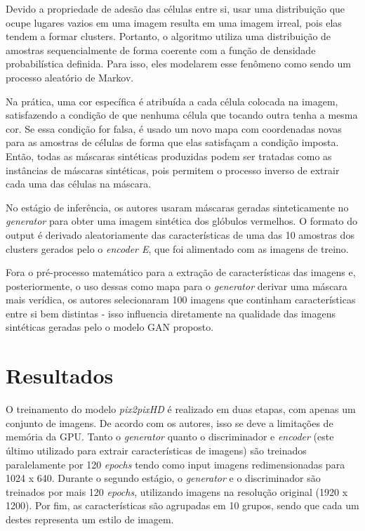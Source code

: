 \documentclass[onecolumn,12pt]{asme2ej}
\begin{document}
Devido a propriedade de adesão das células entre si, usar uma distribuição que ocupe lugares vazios em uma imagem resulta em uma imagem irreal, pois elas tendem a formar clusters. Portanto, o algoritmo utiliza uma distribuição de amostras sequencialmente de forma coerente com a função de densidade probabilística definida. Para isso, eles modelarem esse fenômeno como sendo um processo aleatório de Markov.

Na prática, uma cor específica é atribuída a cada célula colocada na imagem, satisfazendo a condição de que nenhuma célula que tocando outra tenha a mesma cor. Se essa condição for falsa, é usado um novo mapa com coordenadas novas para as amostras de células de forma que elas satisfaçam a condição imposta. Então, todas as máscaras sintéticas produzidas podem ser tratadas como as instâncias de máscaras sintéticas, pois permitem o processo inverso de extrair cada uma das células na máscara.

No estágio de inferência, os autores usaram máscaras geradas sinteticamente no {\it generator} para obter uma imagem sintética dos glóbulos vermelhos. O formato do output é derivado aleatoriamente das características de uma das 10 amostras dos clusters gerados pelo o {\it encoder E}, que foi alimentado com as imagens de treino.

Fora o pré-processo matemático para a extração de características das imagens e, posteriormente, o uso dessas como mapa para o {\it generator} derivar uma máscara mais verídica, os autores selecionaram 100 imagens que continham características entre si bem distintas - isso influencia diretamente na qualidade das imagens sintéticas geradas pelo o modelo GAN proposto.


\section{Resultados}

O treinamento do modelo {\it pix2pixHD} é realizado em duas etapas, com apenas um conjunto de imagens. De acordo com os autores, isso se deve a limitações de memória da GPU. Tanto o {\it generator} quanto o discriminador e {\it encoder} (este último utilizado para extrair características de imagens) são treinados paralelamente por 120 {\it epochs} tendo como input imagens redimensionadas para 1024 x 640. Durante o segundo estágio, o {\it generator} e o discriminador são treinados por mais 120 {\it epochs}, utilizando imagens na resolução original (1920 x 1200). Por fim, as características são agrupadas em 10 grupos, sendo que cada um destes representa um estilo de imagem.
\end{document}
